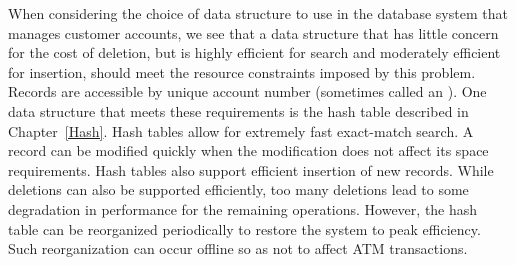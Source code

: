 \begin{example}
When considering the choice of data structure to use in the database
system that manages customer accounts, we see that
a data structure that has little concern for the cost of deletion,
but is highly efficient for search and moderately efficient for
insertion, should meet the resource constraints imposed by this
problem.
Records are accessible by unique account number (sometimes called an
).
One data structure that meets these requirements is the hash
table described in Chapter~\ref{Hash}.
Hash tables allow for extremely fast exact-match search.
A record can be modified quickly when the modification does not affect
its space requirements.
Hash tables also support efficient insertion of new records.
While deletions can also be supported efficiently, too many deletions
lead to some degradation in performance for the remaining operations.
However, the hash table can be reorganized periodically to restore the
system to peak efficiency.
Such reorganization can occur offline so as not to affect ATM
transactions.
\end{example}

